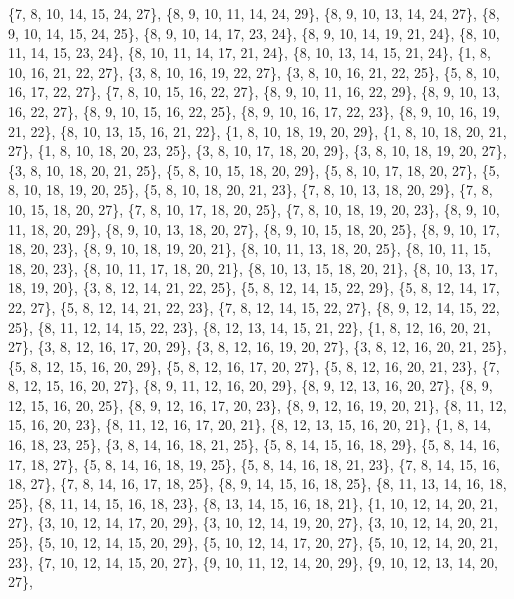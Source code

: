 \documentclass[11pt,a4paper]{article}
\begin{document}
{\{7, 8, 10, 14, 15, 24, 27\}, \{8, 9, 10, 11, 14, 24, 29\}, \{8, 9, 10, 13, 14, 24, 27\}, \{8, 9, 10, 14, 15, 24, 25\}, \{8, 9, 10, 14, 17, 23, 24\},
\{8, 9, 10, 14, 19, 21, 24\}, \{8, 10, 11, 14, 15, 23, 24\}, \{8, 10, 11, 14, 17, 21, 24\}, \{8, 10, 13, 14, 15, 21, 24\}, \{1, 8, 10, 16, 21, 22, 27\},
\{3, 8, 10, 16, 19, 22, 27\}, \{3, 8, 10, 16, 21, 22, 25\}, \{5, 8, 10, 16, 17, 22, 27\}, \{7, 8, 10, 15, 16, 22, 27\}, \{8, 9, 10, 11, 16, 22, 29\},
\{8, 9, 10, 13, 16, 22, 27\}, \{8, 9, 10, 15, 16, 22, 25\}, \{8, 9, 10, 16, 17, 22, 23\}, \{8, 9, 10, 16, 19, 21, 22\}, \{8, 10, 13, 15, 16, 21, 22\},
\{1, 8, 10, 18, 19, 20, 29\}, \{1, 8, 10, 18, 20, 21, 27\}, \{1, 8, 10, 18, 20, 23, 25\}, \{3, 8, 10, 17, 18, 20, 29\}, \{3, 8, 10, 18, 19, 20, 27\},
\{3, 8, 10, 18, 20, 21, 25\}, \{5, 8, 10, 15, 18, 20, 29\}, \{5, 8, 10, 17, 18, 20, 27\}, \{5, 8, 10, 18, 19, 20, 25\}, \{5, 8, 10, 18, 20, 21, 23\},
\{7, 8, 10, 13, 18, 20, 29\}, \{7, 8, 10, 15, 18, 20, 27\}, \{7, 8, 10, 17, 18, 20, 25\}, \{7, 8, 10, 18, 19, 20, 23\}, \{8, 9, 10, 11, 18, 20, 29\},
\{8, 9, 10, 13, 18, 20, 27\}, \{8, 9, 10, 15, 18, 20, 25\}, \{8, 9, 10, 17, 18, 20, 23\}, \{8, 9, 10, 18, 19, 20, 21\}, \{8, 10, 11, 13, 18, 20, 25\},
\{8, 10, 11, 15, 18, 20, 23\}, \{8, 10, 11, 17, 18, 20, 21\}, \{8, 10, 13, 15, 18, 20, 21\}, \{8, 10, 13, 17, 18, 19, 20\}, \{3, 8, 12, 14, 21, 22, 25\},
\{5, 8, 12, 14, 15, 22, 29\}, \{5, 8, 12, 14, 17, 22, 27\}, \{5, 8, 12, 14, 21, 22, 23\}, \{7, 8, 12, 14, 15, 22, 27\}, \{8, 9, 12, 14, 15, 22, 25\},
\{8, 11, 12, 14, 15, 22, 23\}, \{8, 12, 13, 14, 15, 21, 22\}, \{1, 8, 12, 16, 20, 21, 27\}, \{3, 8, 12, 16, 17, 20, 29\}, \{3, 8, 12, 16, 19, 20, 27\},
\{3, 8, 12, 16, 20, 21, 25\}, \{5, 8, 12, 15, 16, 20, 29\}, \{5, 8, 12, 16, 17, 20, 27\}, \{5, 8, 12, 16, 20, 21, 23\}, \{7, 8, 12, 15, 16, 20, 27\},
\{8, 9, 11, 12, 16, 20, 29\}, \{8, 9, 12, 13, 16, 20, 27\}, \{8, 9, 12, 15, 16, 20, 25\}, \{8, 9, 12, 16, 17, 20, 23\}, \{8, 9, 12, 16, 19, 20, 21\},
\{8, 11, 12, 15, 16, 20, 23\}, \{8, 11, 12, 16, 17, 20, 21\}, \{8, 12, 13, 15, 16, 20, 21\}, \{1, 8, 14, 16, 18, 23, 25\}, \{3, 8, 14, 16, 18, 21, 25\},
\{5, 8, 14, 15, 16, 18, 29\}, \{5, 8, 14, 16, 17, 18, 27\}, \{5, 8, 14, 16, 18, 19, 25\}, \{5, 8, 14, 16, 18, 21, 23\}, \{7, 8, 14, 15, 16, 18, 27\},
\{7, 8, 14, 16, 17, 18, 25\}, \{8, 9, 14, 15, 16, 18, 25\}, \{8, 11, 13, 14, 16, 18, 25\}, \{8, 11, 14, 15, 16, 18, 23\}, \{8, 13, 14, 15, 16, 18, 21\},
\{1, 10, 12, 14, 20, 21, 27\}, \{3, 10, 12, 14, 17, 20, 29\}, \{3, 10, 12, 14, 19, 20, 27\}, \{3, 10, 12, 14, 20, 21, 25\}, \{5, 10, 12, 14, 15, 20, 29\},
\{5, 10, 12, 14, 17, 20, 27\}, \{5, 10, 12, 14, 20, 21, 23\}, \{7, 10, 12, 14, 15, 20, 27\}, \{9, 10, 11, 12, 14, 20, 29\}, \{9, 10, 12, 13, 14, 20, 27\},
}
\end{document}
